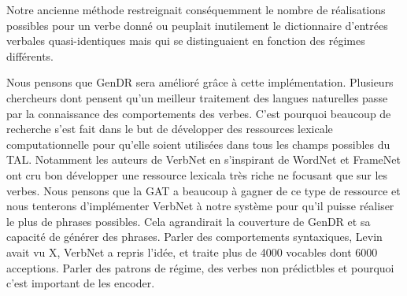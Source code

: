 
Notre ancienne méthode restreignait conséquemment le nombre de réalisations possibles pour un verbe donné ou peuplait inutilement le dictionnaire d'entrées verbales quasi-identiques mais qui se distinguaient en fonction des régimes différents. 

Nous pensons que GenDR sera amélioré grâce à cette implémentation. Plusieurs chercheurs dont \cite{SchulerVerbnetBroadcoverageComprehensive2005,Korhonenlargesubcategorizationlexicon2006} pensent qu'un meilleur traitement des langues naturelles passe par la connaissance des comportements des verbes. C'est pourquoi beaucoup de recherche s'est fait dans le but de développer des ressources lexicale computationnelle pour qu'elle soient utilisées dans tous les champs possibles du \ac{TAL}. Notamment les auteurs de VerbNet en s'inspirant de WordNet et FrameNet ont cru bon développer une ressource lexicala très riche ne focusant que sur les verbes. Nous pensons que la \ac{GAT} a beaucoup à gagner de ce type de ressource et nous tenterons d'implémenter VerbNet à notre système pour qu'il puisse réaliser le plus de phrases possibles. Cela agrandirait la couverture de GenDR et sa capacité de générer des phrases. Parler des comportements syntaxiques, Levin avait vu X, VerbNet a repris l'idée, et traite plus de 4000 vocables dont 6000 acceptions. Parler des patrons de régime, des verbes non prédictbles et pourquoi c'est important de les encoder.

